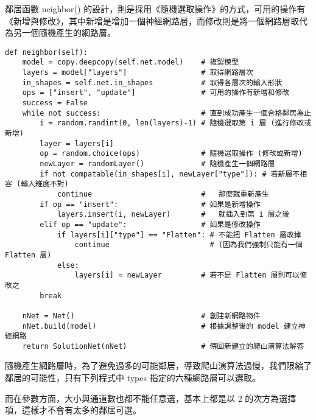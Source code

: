 \documentclass{article}
\begin{document}
鄰居函數 neighbor() 的設計，則是採用《隨機選取操作》的方式，可用的操作有《新增與修改》，其中新增是增加一個神經網路層，而修改則是將一個網路層取代為另一個隨機產生的網路層。

\begin{minipage}{\linewidth}
\begin{lstlisting}
def neighbor(self):
    model = copy.deepcopy(self.net.model)    # 複製模型
    layers = model["layers"]                 # 取得網路層次
    in_shapes = self.net.in_shapes           # 取得各層次的輸入形狀
    ops = ["insert", "update"]               # 可用的操作有新增和修改
    success = False
    while not success:                       # 直到成功產生一個合格鄰居為止
        i = random.randint(0, len(layers)-1) # 隨機選取第 i 層 (進行修改或新增)
        layer = layers[i]
        op = random.choice(ops)              # 隨機選取操作 (修改或新增)
        newLayer = randomLayer()             # 隨機產生一個網路層
        if not compatable(in_shapes[i], newLayer["type"]): # 若新層不相容 (輸入維度不對)
            continue                         #   那麼就重新產生
        if op == "insert":                   # 如果是新增操作
            layers.insert(i, newLayer)       #   就插入到第 i 層之後
        elif op == "update":                 # 如果是修改操作
            if layers[i]["type"] == "Flatten": # 不能把 Flatten 層改掉
                continue                       # (因為我們強制只能有一個 Flatten 層)
            else:
                layers[i] = newLayer         # 若不是 Flatten 層則可以修改之
        break

    nNet = Net()                             # 創建新網路物件
    nNet.build(model)                        # 根據調整後的 model 建立神經網路
    return SolutionNet(nNet)                 # 傳回新建立的爬山演算法解答
\end{lstlisting}
\end{minipage}

隨機產生網路層時，為了避免過多的可能鄰居，導致爬山演算法過慢，我們限縮了鄰居的可能性，只有下列程式中 types 指定的六種網路層可以選取。

而在參數方面，大小與通道數也都不能任意選，基本上都是以 2 的次方為選擇項，這樣才不會有太多的鄰居可選。
\end{document}
